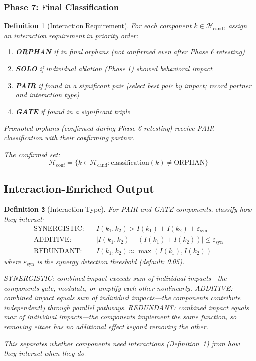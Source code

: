 \documentclass[11pt]{article}
\newtheorem{definition}{Definition}[section]
\begin{document}
\subsubsection{Phase 7: Final Classification}

\begin{definition}[Interaction Requirement]
\label{def:interaction-requirement}
For each component $k \in \mathcal{H}_{\text{cand}}$, assign an interaction requirement in priority order:
\begin{enumerate}[nosep]
\item \textbf{ORPHAN} if in final orphans (not confirmed even after Phase 6 retesting)
\item \textbf{SOLO} if individual ablation (Phase 1) showed behavioral impact
\item \textbf{PAIR} if found in a significant pair (select best pair by impact; record partner and interaction type)
\item \textbf{GATE} if found in a significant triple
\end{enumerate}
Promoted orphans (confirmed during Phase 6 retesting) receive PAIR classification with their confirming partner.

The confirmed set:
\begin{equation}
\mathcal{H}_{\text{conf}} = \{k \in \mathcal{H}_{\text{cand}} : \text{classification}(k) \neq \text{ORPHAN}\}
\end{equation}
\end{definition}

\subsection{Interaction-Enriched Output}

\begin{definition}[Interaction Type]
\label{def:interaction-type-three}
For PAIR and GATE components, classify how they interact:
\begin{align}
\text{SYNERGISTIC:} \quad & I(k_1, k_2) > I(k_1) + I(k_2) + \varepsilon_{\text{syn}} \\
\text{ADDITIVE:} \quad & |I(k_1, k_2) - (I(k_1) + I(k_2))| \leq \varepsilon_{\text{syn}} \\
\text{REDUNDANT:} \quad & I(k_1, k_2) \approx \max(I(k_1), I(k_2))
\end{align}
where $\varepsilon_{\text{syn}}$ is the synergy detection threshold (default: 0.05).

SYNERGISTIC: combined impact exceeds sum of individual impacts---the components gate, modulate, or amplify each other nonlinearly. ADDITIVE: combined impact equals sum of individual impacts---the components contribute independently through parallel pathways. REDUNDANT: combined impact equals max of individual impacts---the components implement the same function, so removing either has no additional effect beyond removing the other.

This separates \emph{whether} components need interactions (Definition~\ref{def:interaction-requirement}) from \emph{how} they interact when they do.
\end{definition}
\end{document}
